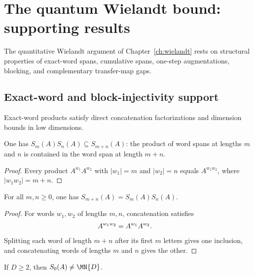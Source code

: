 \chapter{The quantum Wielandt bound: supporting results}
\label{ch:wielandt_supporting_results}

The quantitative Wielandt argument of Chapter~\ref{ch:wielandt} rests on
structural properties of exact-word spans, cumulative spans, one-step
augmentations, blocking, and complementary transfer-map gaps.

\section{Exact-word and block-injectivity support}
\label{sec:app_wielandt_exact_word_support}

Exact-word products satisfy direct concatenation factorizations and dimension
bounds in low dimensions.

\begin{lemma}\label{lem:word_span_mul}
    \leanok
    One has $S_m(A)S_n(A)\subseteq S_{m+n}(A)$:
    the product of word spans at lengths $m$ and $n$
    is contained in the word span at length $m+n$.
\end{lemma}

\begin{proof}\leanok
    Every product $A^{w_1}A^{w_2}$ with $|w_1|=m$
    and $|w_2|=n$ equals $A^{w_1w_2}$, where
    $|w_1w_2|=m+n$.
\end{proof}

\begin{lemma}
    \label{thm:word_span_add_exact}
    \leanok
    For all $m,n\geq 0$, one has $S_{m+n}(A)=S_m(A)S_n(A)$.
\end{lemma}

\begin{proof}
    \leanok
    For words $w_1,w_2$ of lengths $m,n$, concatenation satisfies
    \begin{align}
        A^{w_1w_2} & =A^{w_1}A^{w_2}.
        \notag
    \end{align}
    Splitting each word of length $m+n$ after its first $m$ letters gives one
    inclusion, and concatenating words of lengths $m$ and $n$ gives the other.
\end{proof}

\begin{lemma}
    \label{lem:wordspan_zero_ne_top}
    \leanok
    If $D\ge2$, then $S_0(A)\neq\MN{D}$.
\end{lemma}

